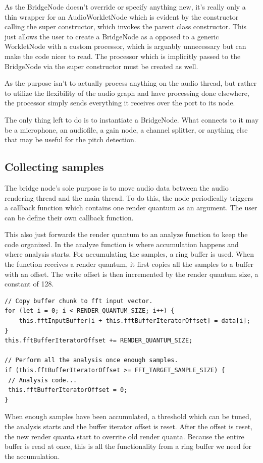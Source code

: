 As the BridgeNode doesn't override or specify anything new, it's really only a thin wrapper for an AudioWorkletNode which is evident by the constructor calling the super constructor, which invokes the parent class constructor. This just allows the user to create a BridgeNode as a opposed to a generic WorkletNode with a custom processor, which is arguably unnecessary but can make the code nicer to read. The processor which is implicitly passed to the BridgeNode via the super constructor must be created as well.

As the purpose isn't to actually process anything on the audio thread, but rather to utilize the flexibility of the audio graph and have processing done elsewhere, the processor simply sends everything it receives over the port to its node. 

The only thing left to do is to instantiate a BridgeNode. What connects to it may be a microphone, an audiofile, a gain node, a channel splitter, or anything else that may be useful for the pitch detection.


\subsection{Collecting samples}
The bridge node's sole purpose is to move audio data between the audio rendering thread and the main thread. To do this, the node periodically triggers a callback function which contains one render quantum as an argument. The user can be define their own callback function.

This also just forwards the render quantum to an analyze function to keep the code organized. In the analyze function is where accumulation happens and where analysis starts. For accumulating the samples, a ring buffer is used. When the function receives a render quantum, it first copies all the samples to a buffer with an offset. The write offset is then incremented by the render quantum size, a constant of 128.
\begin{lstlisting}[style=javascript]
// Copy buffer chunk to fft input vector.
for (let i = 0; i < RENDER_QUANTUM_SIZE; i++) {
    this.fftInputBuffer[i + this.fftBufferIteratorOffset] = data[i];
}
this.fftBufferIteratorOffset += RENDER_QUANTUM_SIZE;

// Perform all the analysis once enough samples.
if (this.fftBufferIteratorOffset >= FFT_TARGET_SAMPLE_SIZE) {
 // Analysis code...
 this.fftBufferIteratorOffset = 0;
}
\end{lstlisting}
When enough samples have been accumulated, a threshold which can be tuned, the analysis starts and the buffer iterator offset is reset. After the offset is reset, the new render quanta start to overrite old render quanta. Because the entire buffer is read at once, this is all the functionality from a ring buffer we need for the accumulation. 

